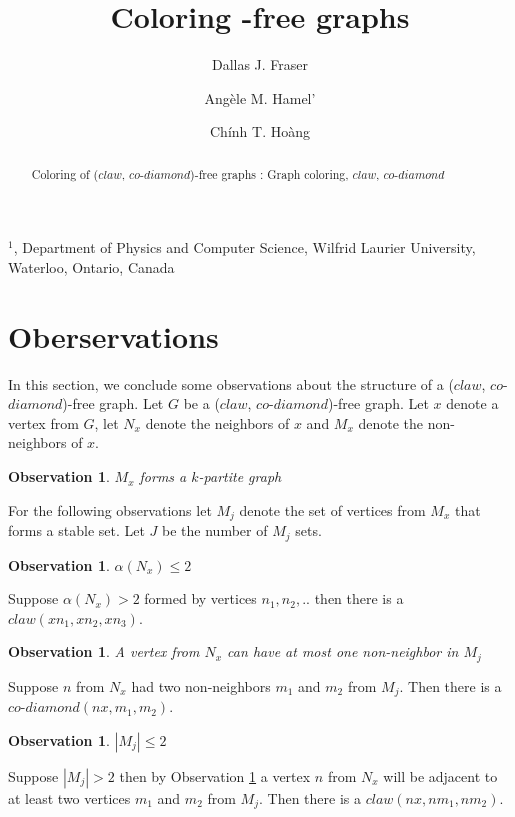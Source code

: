 \documentclass[12pt]{article}
\title{Coloring {\CCD}-free graphs}
\author{
	Dallas J. Fraser\inst{1}
	\and Ang\`ele M. Hamel'\inst{1}
	\and Ch\'inh T. Ho\`ang\inst{1}
}
\newtheorem{Observation}[Theorem]{Observation}
\def\inst#1{$^{#1}$}
\def\CCD{($claw$, $co$-$diamond$)}
\begin{document}
\maketitle

\begin{center}
{\footnotesize

\inst{1}, Department of Physics and Computer Science, Wilfrid Laurier
University, \\Waterloo, Ontario, Canada}

\end{center}

\begin{abstract}
Coloring of {\CCD}-free graphs
: Graph coloring, $claw$, $co$-$diamond$
\end{abstract}

\section{Oberservations}\label{sec:observations}
In this section, we conclude some observations about the structure of a {\CCD}-free graph. Let $G$ be a {\CCD}-free graph. Let $x$ denote a vertex from $G$, let $N_x$ denote the neighbors of $x$ and $M_x$ denote the non-neighbors of $x$.

\begin{Observation}\label{obs:mx-k-partite}
$M_x$ forms a $k$-partite graph
\end{Observation}
For the following observations let $M_j$ denote the set of vertices from $M_x$ that forms a stable set. Let $J$ be the number of $M_j$ sets.

\begin{Observation}\label{obs:alpha-nx}
$\alpha(N_x) \leq 2$
\end{Observation}
 Suppose $\alpha(N_x) > 2$ formed by vertices $n_1,n_2, ..$ then there is a $claw (xn_1, xn_2, xn_3)$.

\begin{Observation}\label{obs:nx-mj}
A vertex from $N_x$ can have at most one non-neighbor in $M_j$
\end{Observation}
 Suppose $n$ from $N_x$ had two non-neighbors $m_1$ and $m_2$ from $M_j$. Then there is a $co$-$diamond (nx, m_1, m_2)$.

\begin{Observation}\label{obs:mj-2}
$|M_j| \leq 2$
\end{Observation}
 Suppose $|M_j| > 2$ then by Observation \ref{obs:nx-mj} a vertex $n$ from $N_x$ will be adjacent to at least two vertices $m_1$ and $m_2$ from $M_j$. Then there is a $claw (nx, nm_1, nm_2)$.
\end{document}
